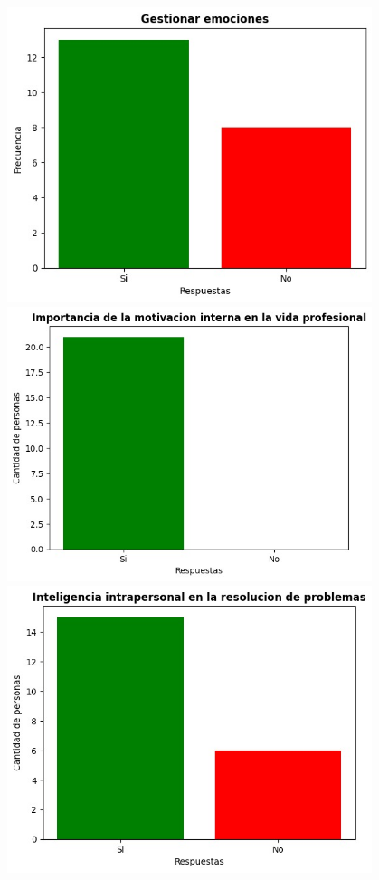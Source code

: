 \begin{center}
\includegraphics[width=0.8\textwidth]{./assets/img/grafica-7.jpeg}
\includegraphics[width=0.8\textwidth]{./assets/img/grafica-5.jpeg}
\includegraphics[width=0.8\textwidth]{./assets/img/grafica-7-1.jpeg}

\end{center}
